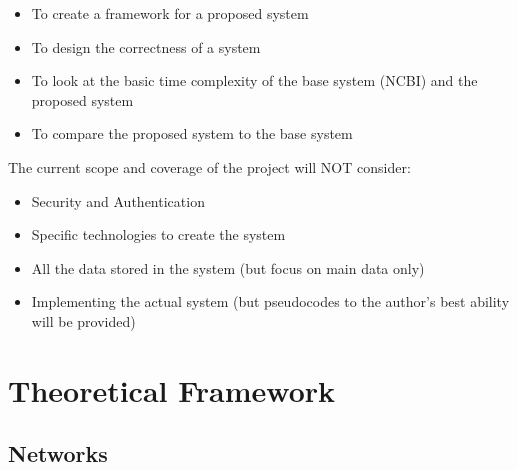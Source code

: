 \documentclass[acmsmall]{acmart}
\begin{document}
\begin{itemize}
    \item To create a framework for a proposed system
    \item To design the correctness of a system
    \item To look at the basic time complexity of the base system (NCBI) and the proposed system
    \item To compare the proposed system to the base system

\end{itemize}

The current scope and coverage of the project will NOT consider:

\begin{itemize}
    \item Security and Authentication 
    \item Specific technologies to create the system
    \item All the data stored in the system (but focus on main data only)
    \item Implementing the actual system (but pseudocodes to the author's best ability will be provided)
\end{itemize}




\section{Theoretical Framework}

\subsection{Networks}
\end{document}
